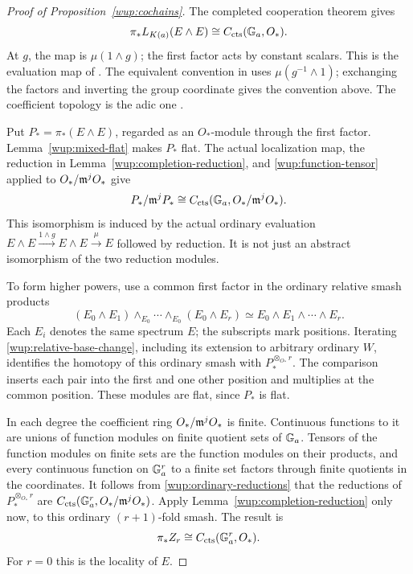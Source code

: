 \begin{proof}[Proof of Proposition~\ref{wup:cochains}]
The completed cooperation theorem gives
\begin{equation}\label{wup:completed-cooperation}
 \pi_*L_{K(a)}(E\wedge E)
 \cong C_{\operatorname{cts}}(\mathbb G_a,O_*).
\end{equation}
At \(g\), the map is \(\mu(1\wedge g)\); the first factor acts by
constant scalars. This is the evaluation map of
\cite[Section~1 and Theorems~4.11 and 6.8]{hovey2004}.
The equivalent convention in
\cite[Proposition~2.2, Equation~(2.3), and Equations~(2.5)--(2.7)]{dh2004}
uses \(\mu(g^{-1}\wedge1)\); exchanging the factors and inverting
the group coordinate gives the convention above. The coefficient
topology is the adic one
\cite[Remark~1.3]{dh2004}.

Put \(P_*=\pi_*(E\wedge E)\), regarded as an \(O_*\)-module through
the first factor. Lemma~\ref{wup:mixed-flat} makes \(P_*\) flat.
The actual localization map, the reduction in
Lemma~\ref{wup:completion-reduction}, and
\eqref{wup:function-tensor} applied to \(O_*/\mathfrak m^jO_*\) give
\begin{equation}\label{wup:ordinary-reductions}
 P_*/\mathfrak m^jP_*
 \cong C_{\operatorname{cts}}(\mathbb G_a,O_*/\mathfrak m^jO_*).
\end{equation}
This isomorphism is induced by the actual ordinary evaluation
\(E\wedge E\xrightarrow{1\wedge g}E\wedge E\xrightarrow{\mu}E\)
followed by reduction. It is not just an abstract isomorphism of
the two reduction modules.

To form higher powers, use a common first factor in the ordinary
relative smash products
\[
 (E_0\wedge E_1)\wedge_{E_0}\cdots
       \wedge_{E_0}(E_0\wedge E_r)
 \simeq E_0\wedge E_1\wedge\cdots\wedge E_r.
\]
Each \(E_i\) denotes the same spectrum \(E\); the subscripts mark
positions. Iterating \eqref{wup:relative-base-change}, including
its extension to arbitrary ordinary \(W\), identifies the homotopy
of this ordinary smash with \(P_*^{\otimes_{O_*}r}\).
The comparison inserts each pair into the first and one other
position and multiplies at the common position. These modules are
flat, since \(P_*\) is flat.

In each degree the coefficient ring \(O_*/\mathfrak m^jO_*\) is finite.
Continuous functions to it are unions of function modules on finite
quotient sets of \(\mathbb G_a\). Tensors of the function modules on finite
sets are the function modules on their products, and every
continuous function on \(\mathbb G_a^r\) to a finite set factors through
finite quotients in the coordinates. It follows from
\eqref{wup:ordinary-reductions} that the reductions of
\(P_*^{\otimes_{O_*}r}\) are
\(C_{\operatorname{cts}}(\mathbb G_a^r,O_*/\mathfrak m^jO_*)\). Apply
Lemma~\ref{wup:completion-reduction} only now, to this ordinary
\((r+1)\)-fold smash. The result is
\begin{equation}\label{wup:power-functions}
 \pi_*Z_r\cong C_{\operatorname{cts}}(\mathbb G_a^r,O_*).
\end{equation}
For \(r=0\) this is the locality of \(E\).


\end{proof}
